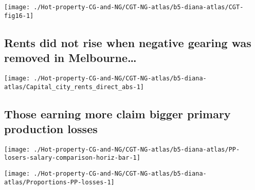 \documentclass[tikz]{standalone}\usepackage[]{graphicx}\usepackage[]{color}
\newenvironment{knitrout}{}{} %
\begin{document}
\begin{knitrout}
\color{fgcolor}
\texttt{[image: ./Hot-property-CG-and-NG/CGT-NG-atlas/b5-diana-atlas/CGT-fig16-1]} 

\end{knitrout}

\subsection{Rents did not rise when negative gearing was removed in Melbourne\dots}
\begin{knitrout}
\color{fgcolor}
\texttt{[image: ./Hot-property-CG-and-NG/CGT-NG-atlas/b5-diana-atlas/Capital\_city\_rents\_direct\_abs-1]} 

\end{knitrout}

\subsection{Those earning more claim bigger primary production losses}
\begin{knitrout}
\color{fgcolor}
\texttt{[image: ./Hot-property-CG-and-NG/CGT-NG-atlas/b5-diana-atlas/PP-losers-salary-comparison-horiz-bar-1]} 

\end{knitrout}

\begin{knitrout}
\color{fgcolor}
\texttt{[image: ./Hot-property-CG-and-NG/CGT-NG-atlas/b5-diana-atlas/Proportions-PP-losses-1]} 

\end{knitrout}
\end{document}
